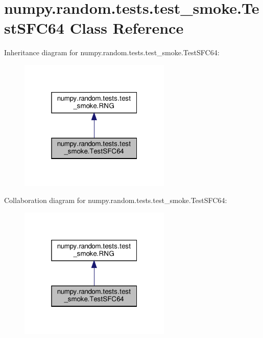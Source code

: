 \hypertarget{classnumpy_1_1random_1_1tests_1_1test__smoke_1_1TestSFC64}{}\section{numpy.\+random.\+tests.\+test\+\_\+smoke.\+Test\+S\+F\+C64 Class Reference}
\label{classnumpy_1_1random_1_1tests_1_1test__smoke_1_1TestSFC64}


Inheritance diagram for numpy.\+random.\+tests.\+test\+\_\+smoke.\+Test\+S\+F\+C64\+:
\nopagebreak
\begin{figure}[H]
\begin{center}
\leavevmode
\includegraphics[width=205pt]{classnumpy_1_1random_1_1tests_1_1test__smoke_1_1TestSFC64__inherit__graph}
\end{center}
\end{figure}


Collaboration diagram for numpy.\+random.\+tests.\+test\+\_\+smoke.\+Test\+S\+F\+C64\+:
\nopagebreak
\begin{figure}[H]
\begin{center}
\leavevmode
\includegraphics[width=205pt]{classnumpy_1_1random_1_1tests_1_1test__smoke_1_1TestSFC64__coll__graph}
\end{center}
\end{figure}
